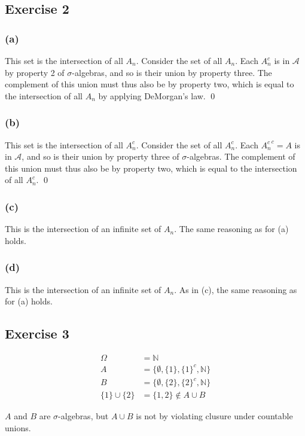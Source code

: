 \documentclass{article}
\begin{document}
\subsection*{Exercise 2}
\subsubsection*{(a)}
This set is the intersection of all $A_n$. 
Consider the set of all $A_n$. Each $A^c_n$ is in $\mathcal{A}$ by property 2 of $\sigma$-algebras, and so is their union by property three. The complement of this union must thus also be by property two, which is equal to the intersection of all $A_n$ by applying DeMorgan's law. \qed

\subsubsection*{(b)}
This set is the intersection of all $A^c_n$. 
Consider the set of all $A^c_n$. Each ${A^c_n}^c = A$ is in $\mathcal{A}$, and so is their union by property three of $\sigma$-algebras. The complement of this union must thus also be by property two, which is equal to the intersection of all $A^c_n$. \qed

\subsubsection*{(c)}
This is the intersection of an infinite set of $A_n$. The same reasoning as for (a) holds. 

\subsubsection*{(d)}
This is the intersection of an infinite set of $A_n$. As in (c), the same reasoning as for (a) holds. 

\subsection*{Exercise 3}
\begin{align*}
    \Omega &= \mathbb{N} \\
    A &= \{\emptyset, \{1\}, \{1\}^c, \mathbb{N}\} \\
    B &= \{\emptyset, \{2\}, \{2\}^c, \mathbb{N}\} \\
    \{1\} \cup \{2\} &= \{1, 2\} \notin A \cup B
\end{align*}

$A$ and $B$ are $\sigma$-algebras, but $A \cup B$ is not by violating clusure under countable unions.
\end{document}
